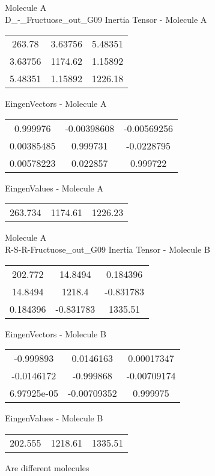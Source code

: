 \newpage
\begin{multicols}{2}
\begin{center}
Molecule A \\ 
D_-_Fructuose_out_G09
Inertia Tensor - Molecule A \\
\vtab
\begin{tabular}{|c c c|}
263.78	 & 	3.63756	 & 	5.48351	 \\
3.63756	 & 	1174.62	 & 	1.15892	 \\
5.48351	 & 	1.15892	 & 	1226.18
\end{tabular}

\vtab
 EingenVectors - Molecule A     \\
\vtab
\begin{tabular}{|c c c|}
0.999976	 & 	-0.00398608	 & 	-0.00569256	 \\
0.00385485	 & 	0.999731	 & 	-0.0228795	 \\
0.00578223	 & 	0.022857	 & 	0.999722
\end{tabular}

\vtab
 EingenValues - Molecule A     \\
\vtab
\begin{tabular}{|c c c|}
263.734	 & 	1174.61	 & 	1226.23
\end{tabular}
\columnbreak
Molecule A \\ 
R-S-R-Fructuose_out_G09
Inertia Tensor - Molecule B \\
\vtab
\begin{tabular}{|c c c|}
202.772	 & 	14.8494	 & 	0.184396	 \\
14.8494	 & 	1218.4	 & 	-0.831783	 \\
0.184396	 & 	-0.831783	 & 	1335.51
\end{tabular}

\vtab
 EingenVectors - Molecule B     \\
\vtab
\begin{tabular}{|c c c|}
-0.999893	 & 	0.0146163	 & 	0.00017347	 \\
-0.0146172	 & 	-0.999868	 & 	-0.00709174	 \\
6.97925e-05	 & 	-0.00709352	 & 	0.999975
\end{tabular}

\vtab
 EingenValues - Molecule B     \\
\vtab
\begin{tabular}{|c c c|}
202.555	 & 	1218.61	 & 	1335.51
\end{tabular}
\textcolor{NavyBlue}{\large Are different molecules}
\end{center}
\end{multicols}
